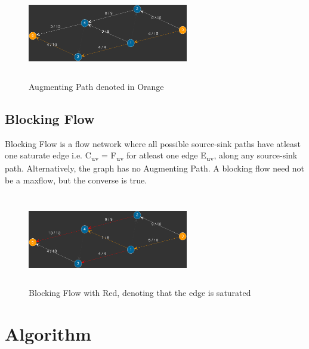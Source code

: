 \documentclass[paper=a4, fontsize=11pt]{scrartcl} %
\numberwithin{equation}{section} %
\numberwithin{figure}{section} %
\numberwithin{table}{section} %
\begin{document}
\begin{figure}[H]
\includegraphics[width=7cm, height=4cm,center]{p8.png}
\caption{Augmenting Path denoted in Orange}
\label{fig:figure2}
\end{figure}



\subsection{Blocking Flow}

Blocking Flow is a flow network where all possible source-sink paths have atleast one saturate edge i.e. C\textsubscript{uv} = F\textsubscript{uv} for atleast one edge E\textsubscript{uv}, along any source-sink path. Alternatively, the graph has no Augmenting Path. A blocking flow need not be a maxflow, but the converse is true.


\begin{figure}[H]
\includegraphics[width=7cm, height=4cm,center]{p9.png}
\caption{ Blocking Flow with Red, denoting that the edge is saturated}
\label{fig:figure2}
\end{figure}




\section{Algorithm}



\end{document}
